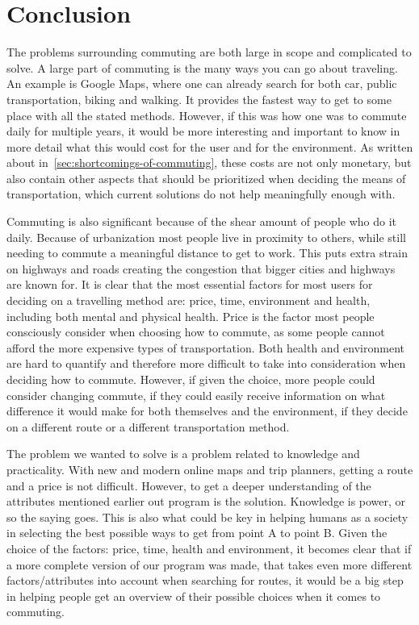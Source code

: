 \chapter{Conclusion}\label{ch:conclusion}
The problems surrounding commuting are both large in scope and complicated to solve.
A large part of commuting is the many ways you can go about traveling.
An example is Google Maps, where one can already search for both car, public transportation, biking and walking.
It provides the fastest way to get to some place with all the stated methods.
However, if this was how one was to commute daily for multiple years, it would be more interesting and important to know
in more detail what this would cost for the user and for the environment.
As written about in~\ref{sec:shortcomings-of-commuting}, these costs are not only monetary, but also contain other
aspects that should be prioritized when deciding the means of transportation, which current solutions do not help
meaningfully enough with.

Commuting is also significant because of the shear amount of people who do it daily.
Because of urbanization most people live in proximity to others, while still needing to commute a meaningful distance to
get to work.
This puts extra strain on highways and roads creating the congestion that bigger cities and highways are known for.
It is clear that the most essential factors for most users for deciding on a travelling method are: price, time,
environment and health, including both mental and physical health.
Price is the factor most people consciously consider when choosing how to commute, as some people cannot afford the
more expensive types of transportation.
Both health and environment are hard to quantify and therefore more difficult to take into consideration when deciding
how to commute.
However, if given the choice, more people could consider changing commute, if they could easily receive information on
what difference it would make for both themselves and the environment, if they decide on a different route or a
different transportation method.

The problem we wanted to solve is a problem related to knowledge and practicality.
With new and modern online maps and trip planners, getting a route and a price is not difficult.
However, to get a deeper understanding of the attributes mentioned earlier out program is the solution.
Knowledge is power, or so the saying goes.
This is also what could be key in helping humans as a society in selecting the best possible ways to get from point A to
point B\@.
Given the choice of the factors: price, time, health and environment, it becomes clear that if a more complete version
of our program was made, that takes even more different factors/attributes into account when searching for routes, it
would be a big step in helping people get an overview of their possible choices when it comes
to commuting.
